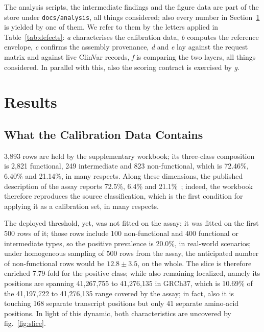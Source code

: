 \documentclass[10pt,journal]{IEEEtran}
\begin{document}
The analysis scripts, the intermediate findings and the figure data are part of the store under \texttt{docs/analysis}, all things considered; also every number in Section~\ref{sec:results} is yielded by one of them. We refer to them by the letters applied in Table~\ref{tab:defects}: \textit{a} characterises the calibration data, \textit{b} computes the reference envelope, \textit{c} confirms the assembly provenance, \textit{d} and \textit{e} lay against the request matrix and against live ClinVar records, \textit{f} is comparing the two layers, all things considered. In parallel with this, also the scoring contract is exercised by \textit{g}.

\section{Results}
\label{sec:results}

\subsection{What the Calibration Data Contains}
\label{sec:res-data}

3{,}893 rows are held by the supplementary workbook; its three-class composition is 2{,}821 functional, 249 intermediate and 823 non-functional, which is 72.46\%, 6.40\% and 21.14\%, in many respects. Along these dimensions, the published description of the assay reports 72.5\%, 6.4\% and 21.1\%~\cite{findlay2018brca1}; indeed, the workbook therefore reproduces the source classification, which is the first condition for applying it as a calibration set, in many respects.

The deployed threshold, yet, was not fitted on the assay; it was fitted on the first 500 rows of it; those rows include 100 non-functional and 400 functional or intermediate types, so the positive prevalence is 20.0\%, in real-world scenarios; under homogeneous sampling of 500 rows from the assay, the anticipated number of non-functional rows would be $12.8\pm3.5$, on the whole. The slice is therefore enriched 7.79-fold for the positive class; while also remaining localized, namely its positions are spanning 41{,}267{,}755 to 41{,}276{,}135 in GRCh37, which is 10.69\% of the 41{,}197{,}722 to 41{,}276{,}135 range covered by the assay; in fact, also it is touching 168 separate transcript positions but only 41 separate amino-acid positions. In light of this dynamic, both characteristics are uncovered by fig.~\ref{fig:slice}.
\end{document}

